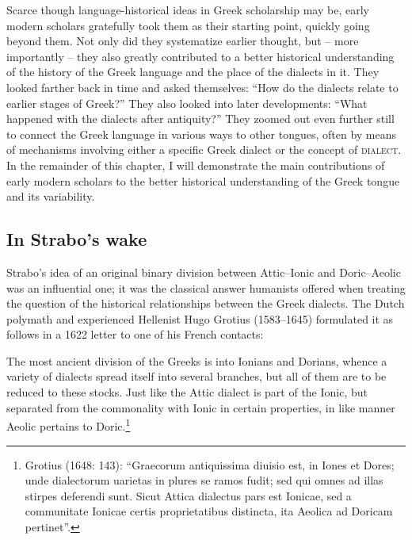 \begin{styleStandard}
Scarce though language-historical ideas in Greek scholarship may be, early modern scholars gratefully took them as their starting point, quickly going beyond them. Not only did they systematize earlier thought, but – more importantly – they also greatly contributed to a better historical understanding of the history of the Greek language and the place of the dialects in it. They looked farther back in time and asked themselves: “How do the dialects relate to earlier stages of Greek?” They also looked into later developments: “What happened with the dialects after antiquity?” They zoomed out even further still to connect the Greek language in various ways to other tongues, often by means of mechanisms involving either a specific Greek dialect or the concept of \textsc{dialect}. In the remainder of this chapter, I will demonstrate the main contributions of early modern scholars to the better historical understanding of the Greek tongue and its variability.
\end{styleStandard}

\subsection{In Strabo’s wake}
\hypertarget{Toc19704836}{}\begin{styleStandard}
Strabo’s idea of an original binary division between Attic–Ionic and Doric–Aeolic was an influential one; it was the classical answer humanists offered when treating the question of the historical relationships between the Greek dialects. The Dutch polymath and experienced Hellenist Hugo Grotius (1583–1645) formulated it as follows in a 1622 letter to one of his French contacts:
\end{styleStandard}

\begin{styleQuote}
The most ancient division of the Greeks is into Ionians and Dorians, whence a variety of dialects spread itself into several branches, but all of them are to be reduced to these stocks. Just like the Attic dialect is part of the Ionic, but separated from the commonality with Ionic in certain properties, in like manner Aeolic pertains to Doric.\footnote{ Grotius (1648: 143): “Graecorum antiquissima diuisio est, in Iones et Dores; unde dialectorum uarietas in plures se ramos fudit; sed qui omnes ad illas stirpes deferendi sunt. Sicut Attica dialectus pars est Ionicae, sed a communitate Ionicae certis proprietatibus distincta, ita Aeolica ad Doricam pertinet”.}
\end{styleQuote}

